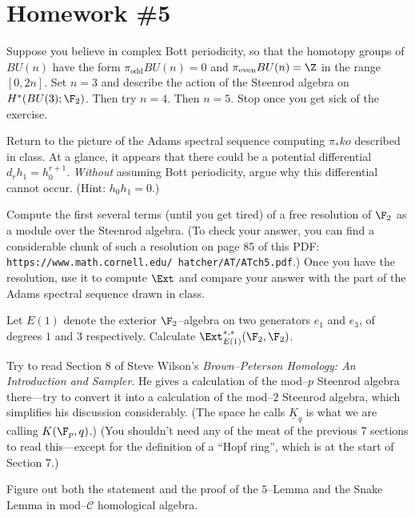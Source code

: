 \section{Homework \#5}

\begin{problem}
Suppose you believe in complex Bott periodicity, so that the homotopy groups of $BU(n)$ have the form $\pi_{\mathrm{odd}} BU(n) = 0$ and $\pi_{\mathrm{even}} BU(n) = \Z$ in the range $[0, 2n]$.  Set $n = 3$ and describe the action of the Steenrod algebra on $H^*(BU(3); \F_2)$.  Then try $n = 4$.  Then $n = 5$.  Stop once you get sick of the exercise.
\end{problem}

\begin{problem}
Return to the picture of the Adams spectral sequence computing $\pi_* ko$ described in class.  At a glance, it appears that there could be a potential differential $d_r h_1 = h_0^{r+1}$.  \emph{Without} assuming Bott periodicity, argue why this differential cannot occur.  (Hint: $h_0 h_1 = 0$.)
\end{problem}

\begin{problem}
Compute the first several terms (until you get tired) of a free resolution of $\F_2$ as a module over the Steenrod algebra.  (To check your answer, you can find a considerable chunk of such a resolution on page 85 of this PDF: \texttt{https://www.math.cornell.edu/~hatcher/AT/ATch5.pdf}.)  Once you have the resolution, use it to compute $\Ext$ and compare your answer with the part of the Adams spectral sequence drawn in class.
\end{problem}

\begin{problem}
Let $E(1)$ denote the exterior $\F_2$--algebra on two generators $e_1$ and $e_3$, of degrees $1$ and $3$ respectively.  Calculate $\Ext_{E(1)}^{*, *}(\F_2, \F_2)$.
\end{problem}

\begin{task}
Try to read Section 8 of Steve Wilson's \textit{Brown--Peterson Homology: An Introduction and Sampler}.  He gives a calculation of the mod--$p$ Steenrod algebra there---try to convert it into a calculation of the mod--$2$ Steenrod algebra, which simplifies his discussion considerably.  (The space he calls $\underline{K}_q$ is what we are calling $K(\F_p, q)$.)  (You shouldn't need any of the meat of the previous 7 sections to read this---except for the definition of a ``Hopf ring'', which is at the start of Section 7.)
\end{task}

\begin{problem}
Figure out both the statement and the proof of the $5$--Lemma and the Snake Lemma in mod--$\mathcal C$ homological algebra.
\end{problem}